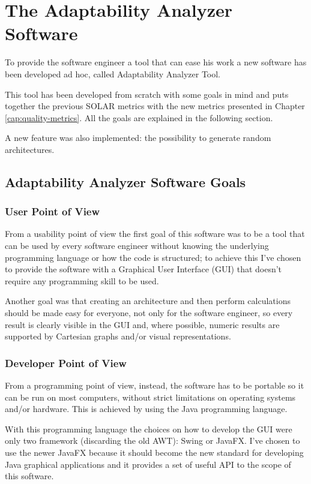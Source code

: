 \chapter{The Adaptability Analyzer Software}
\label{cap:design}

To provide the software engineer a tool that can ease his work a new software has been developed ad hoc, called Adaptability Analyzer Tool.

This tool has been developed from scratch with some goals in mind and puts together the previous SOLAR\cite{solar} metrics with the new metrics presented in Chapter \ref{cap:quality-metrics}. All the goals are explained in the following section.

A new feature was also implemented: the possibility to generate random architectures.

\section{Adaptability Analyzer Software Goals}
\subsection{User Point of View}
From a usability point of view the first goal of this software was to be a tool that can be used by every software engineer without knowing the underlying programming language or how the code is structured; to achieve this I've chosen to provide the software with a Graphical User Interface (GUI) that doesn't require any programming skill to be used.

Another goal was that creating an architecture and then perform calculations should be made easy for everyone, not only for the software engineer, so every result is clearly visible in the GUI and, where possible, numeric results are supported by Cartesian graphs and/or visual representations.

\subsection{Developer Point of View}
From a programming point of view, instead, the software has to be portable so it can be run on most computers, without strict limitations on operating systems and/or hardware. This is achieved by using the Java programming language\cite{java-se}. 

With this programming language the choices on how to develop the GUI were only two framework (discarding the old AWT\cite{awt}): Swing\cite{swing} or JavaFX\cite{javafx}. I've chosen to use the newer JavaFX because it should become the new standard for developing Java graphical applications and it provides a set of useful API to the scope of this software.

